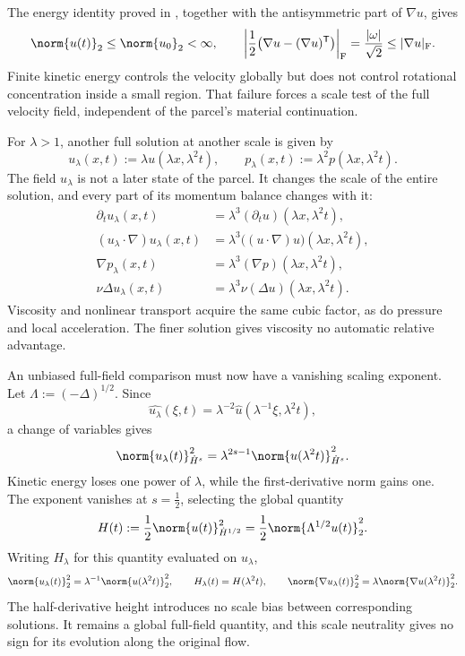 The energy identity proved in , together with the antisymmetric part of \(\nabla u\), gives
\[
  \norm{u(t)}_2
  \leq
  \norm{u_0}_2
  <\infty,
  \qquad
  \left|\frac12\bigl(\nabla u-(\nabla u)^{\mathsf T}\bigr)\right|_{\mathrm F}
  =
  \frac{|\omega|}{\sqrt2}
  \leq
  |\nabla u|_{\mathrm F}.
\]
Finite kinetic energy controls the velocity globally but does not control rotational concentration inside a small region. That failure forces a scale test of the full velocity field, independent of the parcel's material continuation.


For \(\lambda>1\), another full solution at another scale is given by
\[
  u_\lambda(x,t)
  :=
  \lambda u(\lambda x,\lambda^2t),
  \qquad
  p_\lambda(x,t)
  :=
  \lambda^2p(\lambda x,\lambda^2t).
\]
The field \(u_\lambda\) is not a later state of the parcel. It changes the scale of the entire solution, and every part of its momentum balance changes with it:
\[
\begin{aligned}
  \partial_tu_\lambda(x,t)
  &=
  \lambda^3(\partial_tu)(\lambda x,\lambda^2t),
  \\
  (u_\lambda\cdot\nabla)u_\lambda(x,t)
  &=
  \lambda^3\bigl((u\cdot\nabla)u\bigr)(\lambda x,\lambda^2t),
  \\
  \nabla p_\lambda(x,t)
  &=
  \lambda^3(\nabla p)(\lambda x,\lambda^2t),
  \\
  \nu\Delta u_\lambda(x,t)
  &=
  \lambda^3\nu(\Delta u)(\lambda x,\lambda^2t).
\end{aligned}
\]
Viscosity and nonlinear transport acquire the same cubic factor, as do pressure and local acceleration. The finer solution gives viscosity no automatic relative advantage.


An unbiased full-field comparison must now have a vanishing scaling exponent. Let \(\Lambda:=(-\Delta)^{1/2}\). Since
\[
  \widehat{u_\lambda}(\xi,t)
  =
  \lambda^{-2}\widehat u(\lambda^{-1}\xi,\lambda^2t),
\]
a change of variables gives
\[
  \norm{u_\lambda(t)}_{\dot H^s}^2
  =
  \lambda^{2s-1}
  \norm{u(\lambda^2t)}_{\dot H^s}^2.
\]
Kinetic energy loses one power of \(\lambda\), while the first-derivative norm gains one. The exponent vanishes at \(s=\tfrac12\), selecting the global quantity
\[
  H(t)
  :=
  \frac12\norm{u(t)}_{\dot H^{1/2}}^2
  =
  \frac12\norm{\Lambda^{1/2}u(t)}_2^2.
\]
Writing \(H_\lambda\) for this quantity evaluated on \(u_\lambda\),
\[
  \norm{u_\lambda(t)}_2^2
  =
  \lambda^{-1}\norm{u(\lambda^2t)}_2^2,
  \qquad
  H_\lambda(t)=H(\lambda^2t),
  \qquad
  \norm{\nabla u_\lambda(t)}_2^2
  =
  \lambda\norm{\nabla u(\lambda^2t)}_2^2.
\]
The half-derivative height introduces no scale bias between corresponding solutions. It remains a global full-field quantity, and this scale neutrality gives no sign for its evolution along the original flow.


